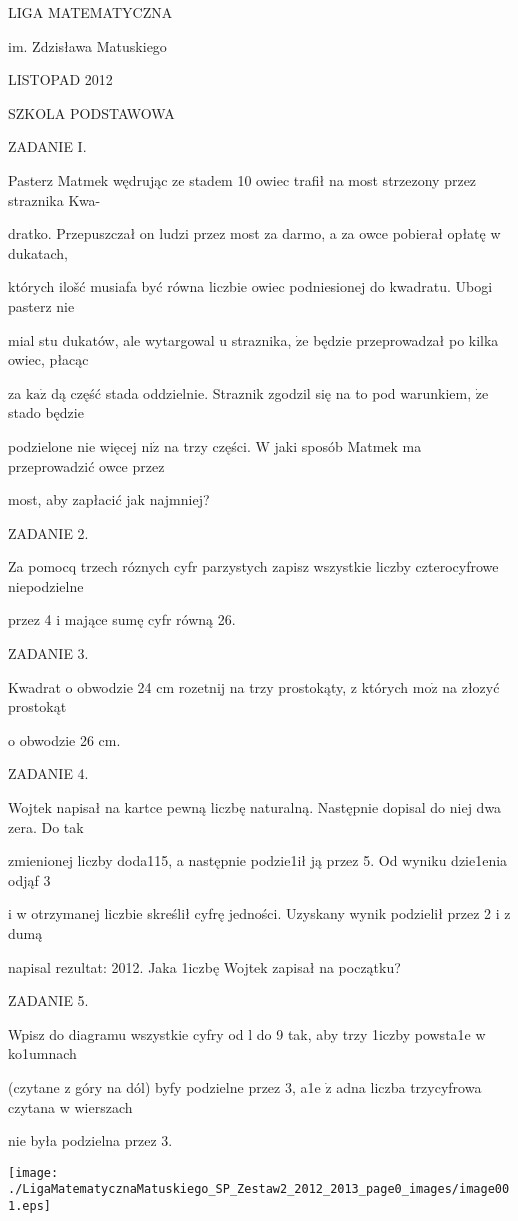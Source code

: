 \documentclass[a4paper,12pt]{article}
\begin{document}
LIGA MATEMATYCZNA

im. Zdzisława Matuskiego

LISTOPAD 2012

SZKOLA PODSTAWOWA

ZADANIE I.

Pasterz Matmek wędrując ze stadem 10 owiec trafił na most strzezony przez straznika Kwa-

dratko. Przepuszczał on ludzi przez most za darmo, a za owce pobierał opłatę w dukatach,

których ilošć musiafa być równa liczbie owiec podniesionej do kwadratu. Ubogi pasterz nie

mial stu dukatów, ale wytargowal $\mathrm{u}$ straznika, $\dot{\mathrm{z}}\mathrm{e}$ będzie przeprowadzał po kilka owiec, płacąc

za $\mathrm{k}\mathrm{a}\dot{\mathrm{z}}$ dą część stada oddzielnie. Straznik zgodzil się na to pod warunkiem, $\dot{\mathrm{z}}\mathrm{e}$ stado będzie

podzielone nie więcej $\mathrm{n}\mathrm{i}\dot{\mathrm{z}}$ na trzy części. $\mathrm{W}$ jaki sposób Matmek ma przeprowadzić owce przez

most, aby zapłacić jak najmniej?

ZADANIE 2.

Za pomocq trzech róznych cyfr parzystych zapisz wszystkie liczby czterocyfrowe niepodzielne

przez 4 i mające sumę cyfr równą 26.

ZADANIE 3.

Kwadrat o obwodzie 24 cm rozetnij na trzy prostokąty, z których $\mathrm{m}\mathrm{o}\dot{\mathrm{z}}$ na złozyć prostokąt

o obwodzie 26 cm.

ZADANIE 4.

Wojtek napisał na kartce pewną liczbę naturalną. Następnie dopisal do niej dwa zera. Do tak

zmienionej liczby doda115, a następnie podzie1ił ją przez 5. Od wyniku dzie1enia odjąf 3

i w otrzymanej liczbie skreślił cyfrę jedności. Uzyskany wynik podzielił przez 2 i z dumą

napisal rezultat: 2012. Jaka 1iczbę Wojtek zapisał na początku?

ZADANIE 5.

Wpisz do diagramu wszystkie cyfry od l do 9 tak, aby trzy 1iczby powsta1e w ko1umnach

(czytane z góry na dól) byfy podzielne przez 3, a1e $\dot{\mathrm{z}}$ adna liczba trzycyfrowa czytana w wierszach

nie była podzielna przez 3.
\begin{center}
\texttt{[image: ./LigaMatematycznaMatuskiego\_SP\_Zestaw2\_2012\_2013\_page0\_images/image001.eps]}
\end{center}
\end{document}

